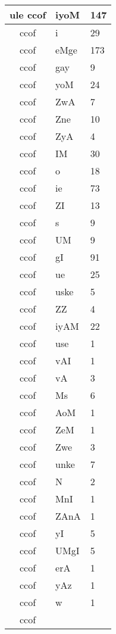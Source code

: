 \documentclass[a4 paper]{article}
\begin{document}
\begin{longtable}{cp{}p{}}
ule ccof & iyoM & 147\\ \midrule ccof & i & 29\\ \midrule ccof & eMge & 173\\ \midrule ccof & gay & 9\\ \midrule ccof & yoM & 24\\ \midrule ccof & ZwA & 7\\ \midrule ccof & Zne & 10\\ \midrule ccof & ZyA & 4\\ \midrule ccof & IM & 30\\ \midrule ccof & o & 18\\ \midrule ccof & ie & 73\\ \midrule ccof & ZI & 13\\ \midrule ccof & s & 9\\ \midrule ccof & UM & 9\\ \midrule ccof & gI & 91\\ \midrule ccof & ue & 25\\ \midrule ccof & uske & 5\\ \midrule ccof & ZZ & 4\\ \midrule ccof & iyAM & 22\\ \midrule ccof & use & 1\\ \midrule ccof & vAI & 1\\ \midrule ccof & vA & 3\\ \midrule ccof & Ms & 6\\ \midrule ccof & AoM & 1\\ \midrule ccof & ZeM & 1\\ \midrule ccof & Zwe & 3\\ \midrule ccof & unke & 7\\ \midrule ccof & N & 2\\ \midrule ccof & MnI & 1\\ \midrule ccof & ZAnA & 1\\ \midrule ccof & yI & 5\\ \midrule ccof & UMgI & 5\\ \midrule ccof & erA & 1\\ \midrule ccof & yAz & 1\\ \midrule ccof & w & 1\\ \midrule ccof 
\end{longtable}
\end{document}
